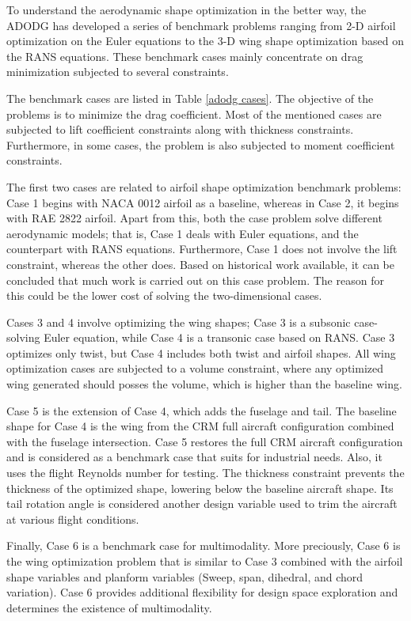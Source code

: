To understand the aerodynamic shape optimization in the better way, the ADODG has developed a series of benchmark problems ranging from 2-D airfoil optimization on the Euler equations to the 3-D wing shape optimization based on the RANS equations.  These benchmark cases mainly concentrate on drag minimization subjected to several constraints.



The benchmark cases \cite{adodg} are listed in Table \ref{adodg cases}. The objective of the problems is to minimize the drag coefficient. Most of the mentioned cases are subjected to lift coefficient constraints along with thickness constraints. Furthermore, in some cases, the problem is also subjected to moment coefficient constraints.

The first two cases are related to airfoil shape optimization benchmark problems: Case 1 begins with NACA 0012 airfoil as a baseline, whereas in Case 2, it begins with RAE 2822 airfoil. Apart from this, both the case problem solve different aerodynamic models; that is, Case 1 deals with Euler equations, and the counterpart with RANS equations. Furthermore, Case 1 does not involve the lift constraint, whereas the other does. Based on historical work available, it can be concluded that much work is carried out on this case problem. The reason for this could be the lower cost of solving the two-dimensional cases.

Cases 3 and 4 involve optimizing the wing shapes; Case 3 is a subsonic case-solving Euler equation, while Case 4 is a transonic case based on RANS. Case 3 optimizes only twist, but Case 4 includes both twist and airfoil shapes. All wing optimization cases are subjected to a volume constraint, where any optimized wing generated should posses the volume, which is higher than the baseline wing. 

Case 5 is the extension of Case 4, which adds the fuselage and tail. The baseline shape for Case 4 is the wing from the CRM full aircraft configuration combined with the fuselage intersection. Case 5 restores the full CRM aircraft configuration and is considered as a benchmark case that suits for industrial needs. Also, it uses the flight Reynolds number for testing. The thickness constraint prevents the thickness of the optimized shape, lowering below the baseline aircraft shape. Its tail rotation angle is considered another design variable used to trim the aircraft at various flight conditions.

Finally, Case 6 is a benchmark case for multimodality. More preciously, Case 6 is the wing optimization problem that is similar to Case 3 combined with the airfoil shape variables and planform variables (Sweep, span, dihedral, and chord variation). Case 6 provides additional flexibility for design space exploration and determines the existence of multimodality. 

